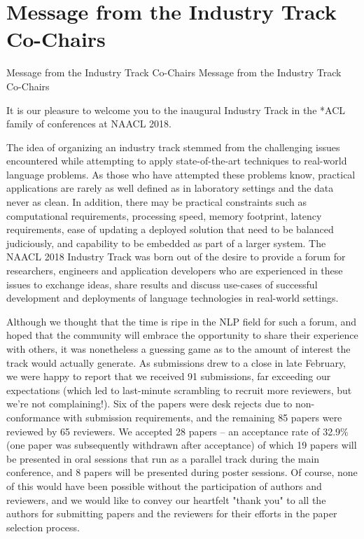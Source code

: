 \vspace{2em}

\section{Message from the Industry Track Co-Chairs}\vspace{2em}
\setheaders%
    {Message from the Industry Track Co-Chairs}%
    {Message from the Industry Track Co-Chairs}
\thispagestyle{emptyheader}

\setlength{\parskip}{1ex}

It is our pleasure to welcome you to the inaugural Industry Track in the *ACL family of conferences at NAACL 2018. 

The idea of organizing an industry track stemmed from the challenging issues encountered while attempting to apply state-of-the-art techniques to real-world language problems. As those who have attempted these problems know, practical applications are rarely as well defined as in laboratory settings and the data never as clean. In addition, there may be practical constraints such as computational requirements, processing speed, memory footprint, latency requirements, ease of updating a deployed solution that need to be balanced judiciously, and capability to be embedded as part of a larger system. The NAACL 2018 Industry Track was born out of the desire to provide a forum for researchers, engineers and application developers who are experienced in these issues to exchange ideas, share results and discuss use-cases of successful development and deployments of language technologies in real-world settings. 

Although we thought that the time is ripe in the NLP field for such a forum, and hoped that the community will embrace the opportunity to share their experience with others, it was nonetheless a guessing game as to the amount of interest the track would actually generate. As submissions drew to a close in late February, we were happy to report that we received 91 submissions, far exceeding our expectations (which led to last-minute scrambling to recruit more reviewers, but we're not complaining!). Six of the papers were desk rejects due to non-conformance with submission requirements, and the remaining 85 papers were reviewed by 65 reviewers. We accepted 28 papers -- an acceptance rate of 32.9\% (one paper was subsequently withdrawn after acceptance) of which 19 papers will be presented in oral sessions that run as a parallel track during the main conference, and 8 papers will be presented during poster sessions. Of course, none of this would have been possible without the participation of authors and reviewers, and we would like to convey our heartfelt "thank you" to all the authors for submitting papers and the reviewers for their efforts in the paper selection process.

